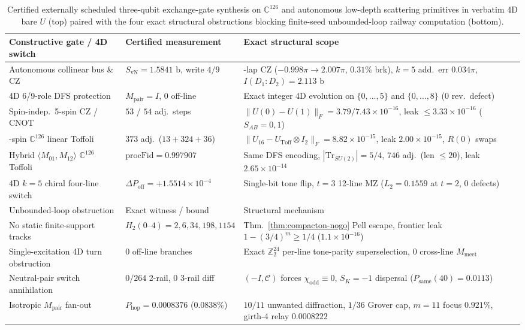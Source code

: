 \begin{table}[tb]
\centering
\caption{Certified externally scheduled three-qubit exchange-gate synthesis on $\mathbb{C}^{126}$ and autonomous
low-depth scattering primitives in verbatim 4D bare $U$ (top) paired with the four exact structural obstructions blocking
finite-seed unbounded-loop railway computation (bottom).}
\label{tab:universality-obstructions}
\footnotesize
\begin{tabularx}{\textwidth}{@{}>{\raggedright\arraybackslash}p{3.95cm}>{\raggedright\arraybackslash}p{3.65cm}>{\raggedright\arraybackslash}X@{}}
\toprule
Constructive gate / 4D switch & Certified measurement & Exact structural scope \\
\midrule
Autonomous collinear bus \& CZ & $S_{\mathrm{vN}} = 1.5841\text{ b}$, write $4/9$ & 2-lap CZ ($-0.998\pi \to 2.007\pi$, $0.31\%$ brk), $k = 5$ add.\ err $0.034\pi$, $I(D_1{:}D_2) = 2.113\text{ b}$ \\
4D 6/9-role DFS protection & $M_{\mathrm{pair}} = I$, $0$ off-line & Exact integer 4D evolution on $\{0,\dots,5\}$ and $\{0,\dots,8\}$ ($0$ rev.\ defect) \\
Spin-indep.\ 5-spin CZ / CNOT & $53$ / $54$ adj.\ steps & $\|U(0) - U(1)\|_F = 3.79 / 7.43 \times 10^{-16}$, leak $\le 3.33 \times 10^{-16}$ ($S_{AB} = 0, 1$) \\
9-spin $\mathbb{C}^{126}$ linear Toffoli & $373$ adj.\ ($13{+}324{+}36$) & $\|U_{16} - U_{\mathrm{Toff}} \otimes I_2\|_F = 8.82 \times 10^{-15}$, leak $2.00 \times 10^{-15}$, $R(0)$ swaps \\
Hybrid $\langle M_{01}, M_{12}\rangle$ $\mathbb{C}^{126}$ Toffoli & $\mathrm{procFid} = 0.997907$ & Same DFS encoding, $|\mathrm{Tr}_{SU(2)}| = 5/4$, $746$ adj.\ (len $\le 20$), leak $2.65 \times 10^{-14}$ \\
4D $k = 5$ chiral four-line switch & $\Delta P_{\mathrm{off}} = +1.5514 \times 10^{-4}$ & Single-bit tone flip, $t = 3$ 12-line MZ ($L_2 = 0.1559$ at $t = 2$, $0$ defects) \\
\midrule
Unbounded-loop obstruction & Exact witness / bound & Structural mechanism \\
\midrule
No static finite-support tracks & $H_2(0\text{--}4) = 2, 6, 34, 198, 1154$ & Thm.~\ref{thm:compacton-nogo} Pell escape, frontier leak $1 - (3/4)^m \ge 1/4$ ($1.1 \times 10^{-16}$) \\
Single-excitation 4D turn obstruction & $0$ off-line branches & Exact $\mathbb{Z}_2^{24}$ per-line tone-parity superselection, $0$ cross-line $M_{\mathrm{meet}}$ \\
Neutral-pair switch annihilation & $0/264$ 2-rail, $0$ 3-rail diff & $(-I, \mathcal{C})$ forces $\chi_{\mathrm{odd}} \equiv 0$, $S_K = -1$ dispersal ($P_{\mathrm{same}}(40) = 0.0113$) \\
Isotropic $M_{\mathrm{pair}}$ fan-out & $P_{\mathrm{hop}} = 0.0008376$ ($0.0838\%$) & $10/11$ unwanted diffraction, $1/36$ Grover cap, $m = 11$ focus $0.921\%$, girth-4 relay $0.0008222$ \\
\bottomrule
\end{tabularx}
\end{table}

